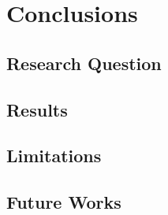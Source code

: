 \chapter{Conclusions}
\section{Research Question}
\section{Results}
\section{Limitations}
\section{Future Works}
